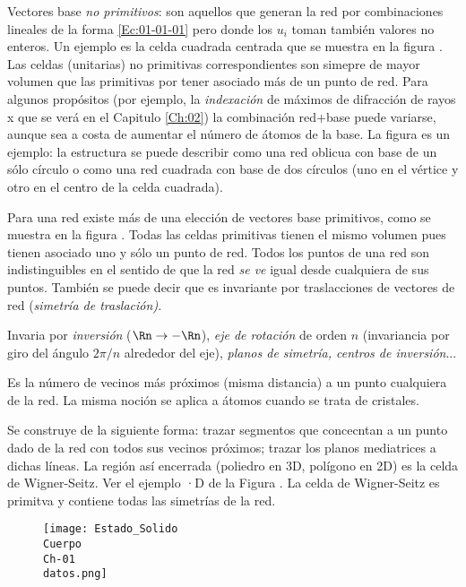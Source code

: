 \begin{definition}
    Vectores base {\it no primitivos}: son aquellos que generan la red por combinaciones lineales de la forma \ref{Ec:01-01-01} pero donde los $u_i$ toman también valores no enteros. Un ejemplo es la celda cuadrada centrada que se muestra en la figura . Las celdas (unitarias) no primitivas correspondientes son simepre de mayor volumen que las primitivas por tener asociado más de un punto de red. Para algunos propósitos (por ejemplo, la {\it indexación} de máximos de difracción de rayos x que se verá en el Capitulo \ref{Ch:02}) la combinación red+base puede variarse, aunque sea a costa de aumentar el número de átomos de la base. La figura es un ejemplo: la estructura se puede describir como una red oblicua con base de un sólo círculo o como una red cuadrada con base de dos círculos (uno en el vértice y otro en el centro de la celda cuadrada).
\end{definition}

\begin{definition}
    Para una red existe más de una elección de vectores base primitivos, como se muestra en la figura . Todas las celdas primitivas tienen el mismo volumen pues tienen asociado uno y sólo un punto de red. Todos los puntos de una red son indistinguibles en el sentido de que la red {\it se ve} igual desde cualquiera de sus puntos. También se puede decir que es invariante por traslacciones de vectores de red (\it{simetría de traslación}).          
\end{definition}

\begin{definition}
    Invaria por {\it inversión} ($\Rn \rightarrow - \Rn$), {\it eje de rotación} de orden $n$ (invariancia por giro del ángulo $2\pi/n$ alrededor del eje), {\it planos de simetría, centros de inversión}...    
\end{definition}

\begin{definition}
    Es la número de vecinos más próximos (misma distancia) a un punto cualquiera de la red. La misma noción se aplica a átomos cuando se trata de cristales.
\end{definition}

\begin{definition}
    Se construye de la siguiente forma: trazar segmentos que concecntan a un punto dado de la red con todos sus vecinos próximos; trazar los planos mediatrices a dichas líneas. La región así encerrada (poliedro en 3D, polígono en 2D) es la celda de Wigner-Seitz. Ver el ejemplo ·D de la Figura  . La celda de Wigner-Seitz es primitva y contiene todas las simetrías de la red.    
\end{definition}

\begin{figure}[h!] \centering
    \texttt{[image: Estado\_Solido\\Cuerpo\\Ch-01\\datos.png]}
\end{figure}

